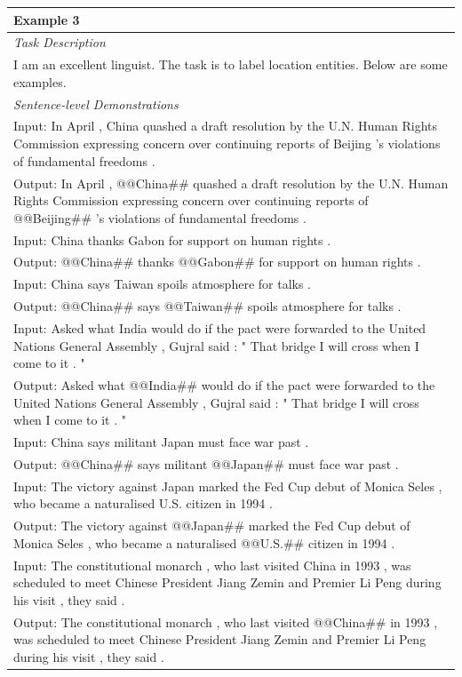 \documentclass{article}
\begin{document}
\begin{table}[th!]
{\begin{tabular}{l}
\textbf{Example 3} \\\midrule
       	\textit{Task Description} \\
I am an excellent linguist. The task is to label location entities. Below are some examples. \\\midrule
\textit{Sentence-level Demonstrations} \\
Input: In April , China quashed a draft resolution by the U.N. Human Rights Commission expressing concern over continuing reports of Beijing 's violations of fundamental freedoms . \\
Output: In April , @@China\#\# quashed a draft resolution by the U.N. Human Rights Commission expressing concern over continuing reports of @@Beijing\#\# 's violations of fundamental freedoms . \\
Input: China thanks Gabon for support on human rights . \\
Output: @@China\#\# thanks @@Gabon\#\# for support on human rights . \\
Input: China says Taiwan spoils atmosphere for talks . \\
Output: @@China\#\# says @@Taiwan\#\# spoils atmosphere for talks . \\
Input: Asked what India would do if the pact were forwarded to the United Nations General Assembly , Gujral said : " That bridge I will cross when I come to it . " \\
Output: Asked what @@India\#\# would do if the pact were forwarded to the United Nations General Assembly , Gujral said : " That bridge I will cross when I come to it . " \\
Input: China says militant Japan must face war past . \\
Output: @@China\#\# says militant @@Japan\#\# must face war past . \\
Input: The victory against Japan marked the Fed Cup debut of Monica Seles , who became a naturalised U.S. citizen in 1994 . \\
Output: The victory against @@Japan\#\# marked the Fed Cup debut of Monica Seles , who became a naturalised @@U.S.\#\# citizen in 1994 . \\
Input: The constitutional monarch , who last visited China in 1993 , was scheduled to meet Chinese President Jiang Zemin and Premier Li Peng during his visit , they said . \\
Output: The constitutional monarch , who last visited @@China\#\# in 1993 , was scheduled to meet Chinese President Jiang Zemin and Premier Li Peng during his visit , they said . \\

\end{tabular}}
\end{table}
\end{document}

